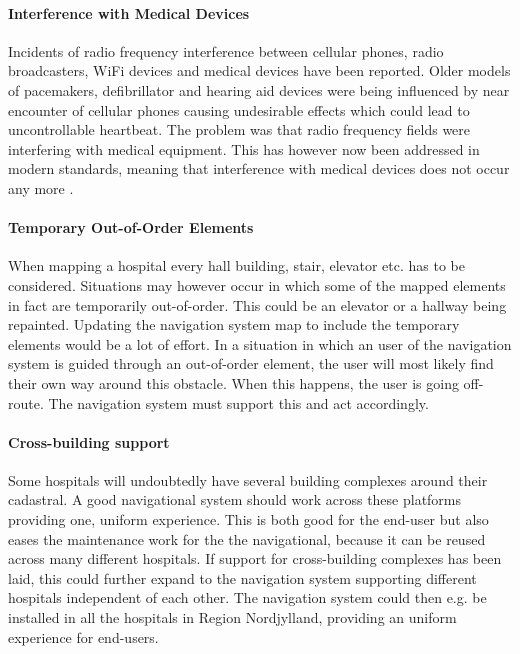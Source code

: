 \paragraph{Interference with Medical Devices}

Incidents of radio frequency interference between cellular phones, radio broadcasters, WiFi devices and medical devices have been reported. Older models of pacemakers, defibrillator and hearing aid devices were being influenced by near encounter of cellular phones causing undesirable effects which could lead to uncontrollable heartbeat. 
The problem was that radio frequency fields were interfering with medical equipment. This has however now been addressed in modern standards, meaning that interference with medical devices does not occur any more \cite{Man1998,Case}.

\paragraph{Temporary Out-of-Order Elements}

When mapping a hospital every hall building, stair, elevator etc. has to be considered. Situations may however occur in which some of the mapped elements in fact are temporarily out-of-order. This could be an elevator or a hallway being repainted. Updating the navigation system map to include the temporary elements would be a lot of effort. In a situation in which an user of the navigation system is guided through an out-of-order element, the user will most likely find their own way around this obstacle. When this happens, the user is going off-route. The navigation system must support this and act accordingly.

\paragraph{Cross-building support}

Some hospitals will undoubtedly have several building complexes around their cadastral. A good navigational system should work across these platforms providing one, uniform experience. This is both good for the end-user but also eases the maintenance work for the the navigational, because it can be reused across many different hospitals. If support for cross-building complexes has been laid, this could further expand to the navigation system supporting different hospitals independent of each other. The navigation system could then e.g. be installed in all the hospitals in Region Nordjylland, providing an uniform experience for end-users.

